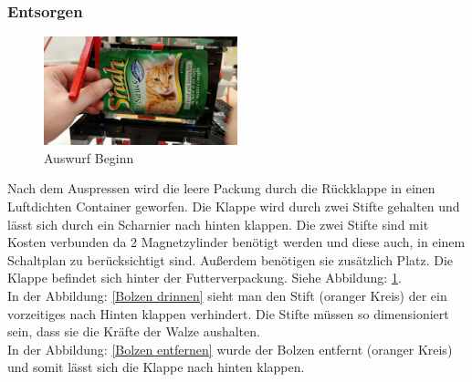 \subsubsection{Entsorgen}

\begin{figure}
\vspace{-30pt}
  \begin{center}
    \includegraphics[width=0.50\textwidth]{Bilder/Ablauf_1_png/Auswurf_1}
  \end{center}
  \caption{Auswurf Beginn}
  \label{Auswurf Beginn}
  \vspace{-10pt}
\end{figure}

Nach dem Auspressen wird die leere Packung durch die Rückklappe in einen Luftdichten Container geworfen. Die Klappe wird durch zwei Stifte gehalten und lässt sich durch ein Scharnier nach hinten klappen. Die zwei Stifte sind mit Kosten verbunden da 2 Magnetzylinder benötigt werden und diese auch, in einem Schaltplan zu berücksichtigt sind. Außerdem benötigen sie zusätzlich Platz. Die Klappe befindet sich hinter der Futterverpackung. Siehe Abbildung: \ref{Auswurf Beginn}. \\

In der Abbildung: \ref{Bolzen drinnen} sieht man den Stift (oranger Kreis) der ein vorzeitiges nach Hinten klappen verhindert. Die Stifte müssen so dimensioniert sein, dass sie die Kräfte der Walze aushalten. \\

In der Abbildung: \ref{Bolzen entfernen} wurde der Bolzen entfernt (oranger Kreis) und somit lässt sich die Klappe nach hinten klappen. 

